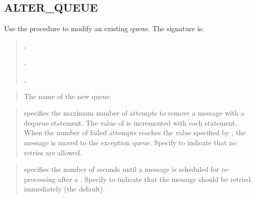\documentclass[letterpaper,10pt,english,openany,oneside]{sphinxmanual}
\begin{document}
\subsection{ALTER\_QUEUE}
\label{\detokenize{alter_queue::doc}}\label{\detokenize{alter_queue:alter-queue}}
Use the  procedure to modify an existing queue. The
signature is:

\begin{quote}

,


,


,
\end{quote}


\begin{quote}

The name of the new queue.
\end{quote}

\begin{quote}

 specifies the maximum number of attempts to
remove a message with a dequeue statement. The value of
 is incremented with each  statement.
When the number of failed attempts reaches the value specified by
, the message is moved to the exception queue.
Specify  to indicate that no retries are allowed.
\end{quote}

\begin{quote}

 specifies the number of seconds until a message is
scheduled for re-processing after a . Specify  to indicate
that the message should be retried immediately (the default).
\end{quote}
\end{document}
